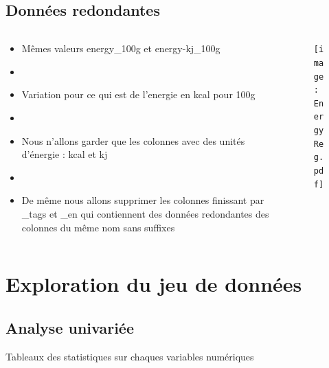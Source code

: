 \subsection{Données redondantes}
\begin{frame}{\insertsubsection}
  \begin{columns}
    \begin{column}{.4\textwidth}
      \begin{itemize}
        \item Mêmes valeurs energy\_100g et energy-kj\_100g
        \item[]
        \item Variation pour ce qui est de l'energie en kcal pour 100g
        \item[]
        \item Nous n'allons garder que les colonnes avec des unités d'énergie : kcal et kj
        \item[]
        \item De même nous allons supprimer les colonnes finissant par \_tags et \_en
              qui contiennent des données redondantes des colonnes du même nom sans suffixes
      \end{itemize}
    \end{column}
    \begin{column}{.6\textwidth}
      \begin{figure}
        \texttt{[image: EnergyReg.pdf]}
      \end{figure}
    \end{column}
  \end{columns}
\end{frame}

\section{Exploration du jeu de données}
\subsection{Analyse univariée}
\begin{frame}{\insertsubsection}
  \begin{table}
    \tiny
    
    
    \resizebox{\textwidth}{!}{}
    \caption{Tableaux des statistiques sur chaques variables numériques}
  \end{table}
\end{frame}

